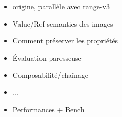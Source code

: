% 
% 
% 
% 
% 


\begin{itemize}
  \item origine, parallèle avec range-v3
  \item Value/Ref semantics des images
  \item Comment préserver les propriétés
  \item Évaluation paresseuse
  \item Composabilité/chaînage
  \item ...
  \item Performances + Bench
\end{itemize}